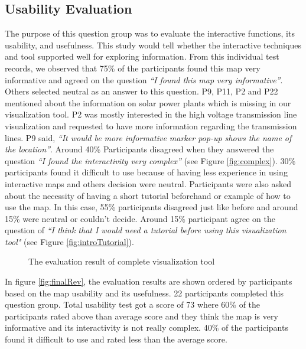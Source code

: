 \subsection*{Usability Evaluation}

The purpose of this question group was to evaluate the interactive functions, its usability, and usefulness. This study would tell whether the interactive techniques and tool supported well for exploring information. From this individual test records, we observed that 75\% of the participants found this map very informative and agreed on the question \textit{“I found this map very informative”}. Others selected neutral as an answer to this question. P9, P11, P2 and P22 mentioned about the information on solar power plants which is missing in our visualization tool. P2 was mostly interested in the high voltage transmission line visualization and requested to have more information regarding the transmission lines. P9 said, \textit{“It would be more informative marker pop-up shows the name of the location”}. Around 40\% Participants disagreed when they answered the question \textit{“I found the interactivity very complex”} (see Figure \ref{fig:complex}). 30\% participants found it difficult to use because of having less experience in using interactive maps and others decision were neutral. Participants were also asked about the necessity of having a short tutorial beforehand or example of how to use the map. In this case, 55\% participants disagreed just like before and around 15\% were neutral or couldn't decide. Around 15\% participant agree on the question of \textit{“I think that I would need a tutorial before using this visualization tool"} (see Figure \ref{fig:introTutorial}). 

\begin{figure}
  \begin{center}
\hfill
{}
\hfill
\caption{The evaluation result of complete visualization tool}
\label{fig:selfExp}
\end{center}
\end{figure}

In figure \ref{fig:finalRev}, the evaluation results are shown ordered by participants based on the map usability and its usefulness. 22 participants completed this question group. Total usability test got a score of 73 where 60\% of the participants rated above than average score and they think the map is very informative and its interactivity is not really complex. 40\% of the participants found it difficult to use and rated less than the average score.

